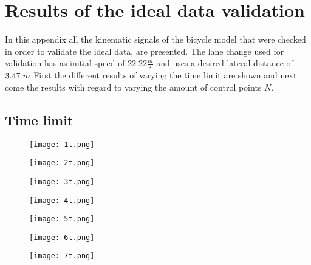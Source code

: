 \chapter{Results of the ideal data validation}
\label{app:B}

In this appendix all the kinematic signals of the bicycle model that were checked in order to validate the ideal data, are presented. The lane change used for validation has as initial speed of $22.22 \frac{m}{s}$ and uses a desired lateral distance of $3.47 \hspace{1mm}m$ First the different results of varying the time limit are shown and next come the results with regard to varying the amount of control points $N$.


\section{Time limit}

\begin{figure}[h!]
	\centering
	\texttt{[image: 1t.png]}
	\label{fig:lat_acc_val}
\end{figure}


\begin{figure}[h!]
	\centering
	\texttt{[image: 2t.png]}
	\label{fig:lat_acc_val}
\end{figure}

\begin{figure}[h!]
	\centering
	\texttt{[image: 3t.png]}
	\label{fig:lat_acc_val}
\end{figure}


\begin{figure}[h!]
	\centering
	\texttt{[image: 4t.png]}
	\label{fig:lat_acc_val}
\end{figure}


\begin{figure}[h!]
	\centering
	\texttt{[image: 5t.png]}
	\label{fig:lat_acc_val}
\end{figure}


\begin{figure}[h!]
	\centering
	\texttt{[image: 6t.png]}
	\label{fig:lat_acc_val}
\end{figure}


\begin{figure}[h!]
	\centering
	\texttt{[image: 7t.png]}
	\label{fig:lat_acc_val}
\end{figure}


